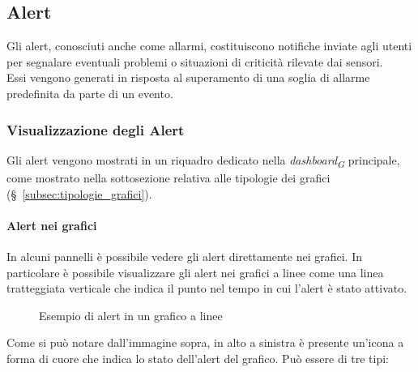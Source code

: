 \subsection{Alert}
Gli alert, conosciuti anche come allarmi, costituiscono notifiche inviate agli utenti per segnalare eventuali problemi o situazioni di criticità rilevate dai sensori.\\
Essi vengono generati in risposta al superamento di una soglia di allarme predefinita da parte di un evento. \\

\subsubsection{Visualizzazione degli Alert}
Gli alert vengono mostrati in un riquadro dedicato nella \textit{dashboard}\textsubscript{\textit{G}} principale, come mostrato nella sottosezione relativa alle tipologie dei grafici (\S~\ref{subsec:tipologie_grafici}). \\

\paragraph{Alert nei grafici}
In alcuni pannelli è possibile vedere gli alert direttamente nei grafici. In particolare è possibile visualizzare gli alert nei grafici a linee come una linea tratteggiata verticale che indica il punto nel tempo in cui l'alert è stato attivato. \\
\begin{figure}[H]
    \centering
    \caption{Esempio di alert in un grafico a linee}
    \label{fig:my_label}
\end{figure}
Come si può notare dall'immagine sopra, in alto a sinistra è presente un'icona a forma di cuore che indica lo stato dell'alert del grafico. Può essere di tre tipi: 

